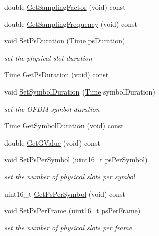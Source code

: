 \begin{DoxyCompactItemize}
\item 
double \hyperlink{classns3_1_1WimaxPhy_a19aa46db3129934d041bec76ad13202e}{Get\+Sampling\+Factor} (void) const 
\item 
double \hyperlink{classns3_1_1WimaxPhy_a6631e99274a6eda81e9cf299d21f212d}{Get\+Sampling\+Frequency} (void) const 
\item 
void \hyperlink{classns3_1_1WimaxPhy_ab1103778368ee99aaa33d7b9e8e8d348}{Set\+Ps\+Duration} (\hyperlink{classns3_1_1Time}{Time} ps\+Duration)
\begin{DoxyCompactList}\small\item\em set the physical slot duration \end{DoxyCompactList}\item 
\hyperlink{classns3_1_1Time}{Time} \hyperlink{classns3_1_1WimaxPhy_a32be5cdaa228280e63faa50d066cec4d}{Get\+Ps\+Duration} (void) const 
\item 
void \hyperlink{classns3_1_1WimaxPhy_a0f5d383f628aba44ed30d1cc2d9bb02f}{Set\+Symbol\+Duration} (\hyperlink{classns3_1_1Time}{Time} symbol\+Duration)
\begin{DoxyCompactList}\small\item\em set the O\+F\+DM symbol duration \end{DoxyCompactList}\item 
\hyperlink{classns3_1_1Time}{Time} \hyperlink{classns3_1_1WimaxPhy_a1e4a5b5bd2ddc74fcc9e1d074b664ab2}{Get\+Symbol\+Duration} (void) const 
\item 
double \hyperlink{classns3_1_1WimaxPhy_a802d0dac9aa107f3403a843c860ff17e}{Get\+G\+Value} (void) const 
\item 
void \hyperlink{classns3_1_1WimaxPhy_ae1146cc81e9ee394e5ca24a2b98dc731}{Set\+Ps\+Per\+Symbol} (uint16\+\_\+t ps\+Per\+Symbol)
\begin{DoxyCompactList}\small\item\em set the number of physical slots per symbol \end{DoxyCompactList}\item 
uint16\+\_\+t \hyperlink{classns3_1_1WimaxPhy_a1d5ed838daa5de38890b9975c8d7e9d8}{Get\+Ps\+Per\+Symbol} (void) const 
\item 
void \hyperlink{classns3_1_1WimaxPhy_a9cb0c394645ada1b5088cf50bed7d481}{Set\+Ps\+Per\+Frame} (uint16\+\_\+t ps\+Per\+Frame)
\begin{DoxyCompactList}\small\item\em set the number of physical slots per frame \end{DoxyCompactList}\item 

\end{DoxyCompactItemize}
